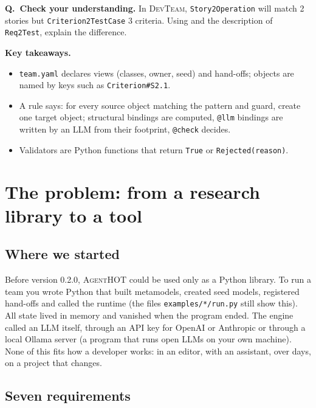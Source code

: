 \documentclass[10pt,a4paper]{article}
\newcommand{\tool}{\textsc{AgentHOT}}
\newcommand{\devteam}{\textsc{DevTeam}}
\newcommand{\code}[1]{\texttt{#1}}
\newcommand{\file}[1]{\texttt{#1}}
\newcounter{think}
\newenvironment{think}[1][Check your understanding]{%
  \refstepcounter{think}%
  \begin{tcolorbox}[enhanced, breakable, colback=thinkbg, colframe=thinkbg, arc=0pt, boxrule=0pt,
     borderline west={2.2pt}{0pt}{thinkbar}, left=8pt, right=8pt, top=5pt, bottom=5pt,
     before skip=8pt, after skip=8pt]
  \textsf{\bfseries\color{thinkbar}Q\thethink.\ #1.}\enspace}{\end{tcolorbox}}
\newenvironment{takeaway}{%
  \begin{tcolorbox}[enhanced, breakable, colback=keybg, colframe=keybg, arc=0pt, boxrule=0pt,
     borderline west={2.2pt}{0pt}{keybar}, left=8pt, right=8pt, top=5pt, bottom=5pt,
     before skip=8pt, after skip=8pt]
  \textsf{\bfseries\color{keybar}Key takeaways.}\par\smallskip}{\end{tcolorbox}}
\begin{document}
\begin{think}
In \devteam{}, \code{Story2Operation} will match 2 stories but
\code{Criterion2TestCase} 3 criteria. Using  and the
description of \code{Req2Test}, explain the difference.
\end{think}

\begin{takeaway}
\begin{itemize}
\item \file{team.yaml} declares views (classes, owner, seed) and hand-offs;
objects are named by keys such as \code{Criterion\#S2.1}.
\item A rule says: for every source object matching the pattern and guard,
create one target object; structural bindings are computed, \code{@llm}
bindings are written by an LLM from their footprint, \code{@check} decides.
\item Validators are Python functions that return \code{True} or
\code{Rejected(reason)}.
\end{itemize}
\end{takeaway}

\section{The problem: from a research library to a tool}\label{sec:problem}

\subsection{Where we started}

Before version 0.2.0, \tool{} could be used only as a Python library. To
run a team you wrote Python that built metamodels, created seed models,
registered hand-offs and called the runtime (the files
\file{examples/*/run.py} still show this). All state lived in memory and
vanished when the program ended. The engine called an LLM itself, through an
API key for OpenAI or Anthropic or through a local Ollama server (a program
that runs open LLMs on your own machine). None of this fits how a developer
works: in an editor, with an assistant, over days, on a project that
changes.

\subsection{Seven requirements}
\end{document}
